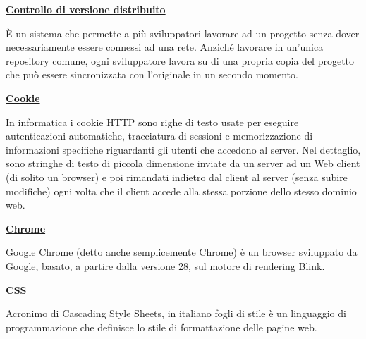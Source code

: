 \bigskip
\begin{addmargin}[0em]{0em}
	\textbf{\underline{Controllo di versione distribuito}}
\end{addmargin}

\medskip
\begin{addmargin}[5em]{1em}	
È un sistema che permette a più sviluppatori lavorare ad un progetto senza dover necessariamente essere connessi ad una rete. Anziché lavorare in un'unica repository comune, ogni sviluppatore lavora su di una propria copia del progetto che può essere sincronizzata con l'originale in un secondo momento.
\end{addmargin}

\bigskip
\begin{addmargin}[0em]{0em}	
	\textbf{\underline{Cookie}}
\end{addmargin}
	
\medskip
\begin{addmargin}[5em]{1em}	
In informatica i cookie HTTP sono righe di testo usate per eseguire autenticazioni automatiche, tracciatura di sessioni e memorizzazione di informazioni specifiche riguardanti gli utenti che accedono al server. Nel dettaglio, sono stringhe di testo di piccola dimensione inviate da un server ad un Web client (di solito un browser) e poi rimandati indietro dal client al server (senza subire modifiche) ogni volta che il client accede alla stessa porzione dello stesso dominio web.
\end{addmargin}

\bigskip
\begin{addmargin}[0em]{0em}	
	\textbf{\underline{Chrome}}
\end{addmargin}
	
\medskip
\begin{addmargin}[5em]{1em}	
Google Chrome (detto anche semplicemente Chrome) è un browser sviluppato da Google, basato, a partire dalla versione 28, sul motore di rendering Blink.
\end{addmargin}

\bigskip
\begin{addmargin}[0em]{0em}	
	\textbf{\underline{CSS}}
\end{addmargin}

\medskip
	\begin{addmargin}[5em]{1em}	
Acronimo di Cascading Style Sheets, in italiano fogli di stile è un linguaggio di programmazione che definisce lo stile di formattazione delle pagine web.
\end{addmargin}

